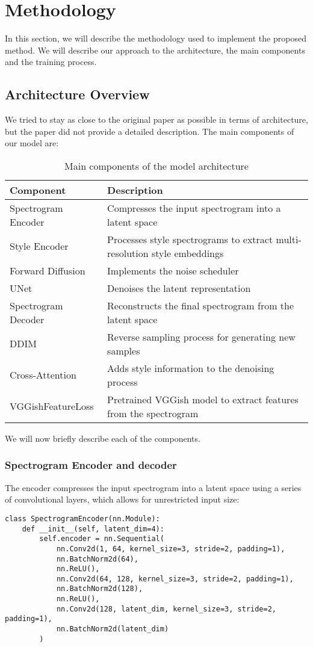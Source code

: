\section{Methodology}

In this section, we will describe the methodology used to implement the proposed method. We will describe our approach to the architecture, the main components and the training process.

\subsection{Architecture Overview}
We tried to stay as close to the original paper as possible in terms of architecture, but the paper did not provide a detailed description. The main components of our model are:

\begin{table}[h]
\centering
\begin{tabular}{|l|p{10cm}|}
\hline
\textbf{Component} & \textbf{Description} \\
\hline
Spectrogram Encoder & Compresses the input spectrogram into a latent space \\
\hline
Style Encoder & Processes style spectrograms to extract multi-resolution style embeddings \\
\hline
Forward Diffusion & Implements the noise scheduler \\
\hline
UNet & Denoises the latent representation \\
\hline
Spectrogram Decoder & Reconstructs the final spectrogram from the latent space \\
\hline
DDIM & Reverse sampling process for generating new samples \\
\hline
Cross-Attention & Adds style information to the denoising process \\
\hline
VGGishFeatureLoss & Pretrained VGGish model to extract features from the spectrogram \\
\hline
\end{tabular}
\caption{Main components of the model architecture}
\label{tab:model-components}
\end{table}

\noindent We will now briefly describe each of the components.

\subsubsection{Spectrogram Encoder and decoder}
The encoder compresses the input spectrogram into a latent space using a series of convolutional layers, which allows for unrestricted input size:
\begin{lstlisting}[basicstyle=\tiny]
class SpectrogramEncoder(nn.Module):
    def __init__(self, latent_dim=4):
        self.encoder = nn.Sequential(
            nn.Conv2d(1, 64, kernel_size=3, stride=2, padding=1),
            nn.BatchNorm2d(64),
            nn.ReLU(),
            nn.Conv2d(64, 128, kernel_size=3, stride=2, padding=1),
            nn.BatchNorm2d(128),
            nn.ReLU(),
            nn.Conv2d(128, latent_dim, kernel_size=3, stride=2, padding=1),
            nn.BatchNorm2d(latent_dim)
        )
\end{lstlisting}

